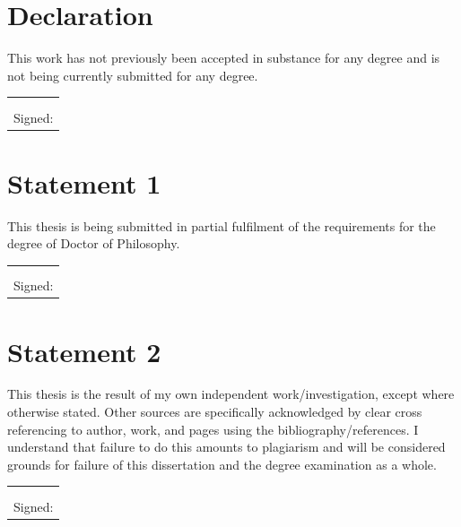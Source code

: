 \documentclass[11pt, a4paper, twoside, openright]{book}
\newcommand{\thesisdate}{\formatdate{1}{6}{2015}}
\begin{document}
\thispagestyle{empty}

\newpage
\thispagestyle{empty}

\mbox{}

\clearpage



\thispagestyle{empty}

\section*{Declaration}

This work has not previously been accepted in substance for any degree
and is not being currently submitted for any degree.

\vspace{0.5cm}
\begin{tabular}{l}
\thesisdate \\
\\
Signed:
\end{tabular}

\section*{Statement 1}
This thesis is being submitted in partial fulfilment of the
requirements for the degree of Doctor of Philosophy.

\vspace{0.5cm}
\begin{tabular}{l}
\thesisdate \\
\\
Signed:
\end{tabular}

\section*{Statement 2}

This thesis is the result of my own independent
work/investigation, except where otherwise stated. Other sources are
specifically acknowledged by clear cross referencing to author, work,
and pages using the bibliography/references. I understand that failure
to do this amounts to plagiarism and will be considered grounds for
failure of this dissertation and the degree examination as a whole.

\vspace{0.5cm}
\begin{tabular}{l}
\thesisdate \\
\\
Signed:
\end{tabular}
\end{document}
